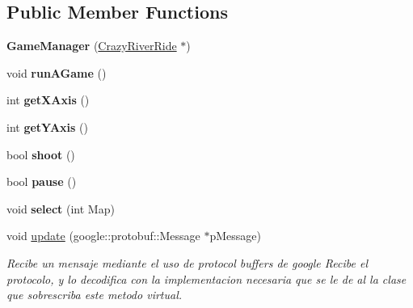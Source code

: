 \subsection*{Public Member Functions}
\begin{DoxyCompactItemize}
\item 
\hypertarget{class_game_manager_a8ca3e8bfd80b9c5637a279ba0a779859}{{\bfseries Game\-Manager} (\hyperlink{class_crazy_river_ride}{Crazy\-River\-Ride} $\ast$)}\label{class_game_manager_a8ca3e8bfd80b9c5637a279ba0a779859}

\item 
\hypertarget{class_game_manager_a46f13cda874d5146c65db959d44607c8}{void {\bfseries run\-A\-Game} ()}\label{class_game_manager_a46f13cda874d5146c65db959d44607c8}

\item 
\hypertarget{class_game_manager_a24ac94e016dc0ad440faa7b88ee31840}{int {\bfseries get\-X\-Axis} ()}\label{class_game_manager_a24ac94e016dc0ad440faa7b88ee31840}

\item 
\hypertarget{class_game_manager_abe4ae648e6067c8bd19a1d020c292560}{int {\bfseries get\-Y\-Axis} ()}\label{class_game_manager_abe4ae648e6067c8bd19a1d020c292560}

\item 
\hypertarget{class_game_manager_a6b43e9e166a906789e4b4aa134218994}{bool {\bfseries shoot} ()}\label{class_game_manager_a6b43e9e166a906789e4b4aa134218994}

\item 
\hypertarget{class_game_manager_a91a7e823176e56f32ca0b582592d7b02}{bool {\bfseries pause} ()}\label{class_game_manager_a91a7e823176e56f32ca0b582592d7b02}

\item 
\hypertarget{class_game_manager_a0c03dfd4e0fd50e0d9159da2b3d15342}{void {\bfseries select} (int Map)}\label{class_game_manager_a0c03dfd4e0fd50e0d9159da2b3d15342}

\item 
void \hyperlink{class_game_manager_abcc7beda88f37957ab1c0711de030a45}{update} (google\-::protobuf\-::\-Message $\ast$p\-Message)
\begin{DoxyCompactList}\small\item\em Recibe un mensaje mediante el uso de protocol buffers de google Recibe el protocolo, y lo decodifica con la implementacion necesaria que se le de al la clase que sobrescriba este metodo virtual. \end{DoxyCompactList}\end{DoxyCompactItemize}


